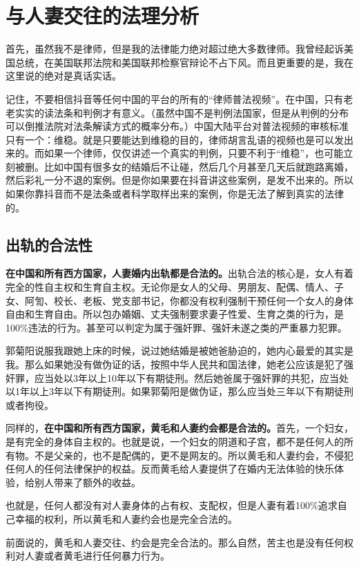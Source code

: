 \section{与人妻交往的法理分析}

首先，虽然我不是律师，但是我的法律能力绝对超过绝大多数律师。我曾经起诉美国总统，在美国联邦法院和美国联邦检察官辩论不占下风。而且更重要的是，我在这里说的绝对是真话实话。

记住，不要相信抖音等任何中国的平台的所有的``律师普法视频''。在中国，只有老老实实的读法条和判例才有意义。（虽然中国不是判例法国家，但是从判例的分布可以倒推法院对法条解读方式的概率分布。）中国大陆平台对普法视频的审核标准只有一个：维稳。就是只要能达到维稳的目的，律师胡言乱语的视频也是可以发出来的。而如果一个律师，仅仅讲述一个真实的判例，只要不利于``维稳''，也可能立刻被删。比如中国有很多女的结婚后不让碰，然后几个月甚至几天后就跑路离婚，然后彩礼一分不退的案例。但是你如果要在抖音讲这些案例，是发不出来的。所以如果你靠抖音而不是法条或者科学取样出来的案例，你是无法了解到真实的法律的。

\subsection{出轨的合法性}

\textbf{在中国和所有西方国家，人妻婚内出轨都是合法的。}出轨合法的核心是，女人有着完全的性自主权和生育自主权。无论你是女人的父母、男朋友、配偶、情人、子女、阿訇、校长、老板、党支部书记，你都没有权利强制干预任何一个女人的身体自由和生育自由。所以包办婚姻、丈夫强制要求妻子性爱、生育之类的行为，是100\%违法的行为。甚至可以判定为属于强奸罪、强奸未遂之类的严重暴力犯罪。

郭菊阳说服我跟她上床的时候，说过她结婚是被她爸胁迫的，她内心最爱的其实是我。那么如果她没有做伪证的话，按照中华人民共和国法律，她老公应该是犯了强奸罪，应当处以3年以上10年以下有期徒刑。然后她爸属于强奸罪的共犯，应当处以1年以上3年以下有期徒刑。如果郭菊阳是做伪证，那么应当处三年以下有期徒刑或者拘役。

同样的，\textbf{在中国和所有西方国家，黄毛和人妻约会都是合法的。}首先，一个妇女，是有完全的身体自主权的。也就是说，一个妇女的阴道和子宫，都不是任何人的所有物。不是父亲的，也不是配偶的，更不是网友的。所以黄毛和人妻约会，不侵犯任何人的任何法律保护的权益。反而黄毛给人妻提供了在婚内无法体验的快乐体验，给别人带来了额外的收益。

也就是，任何人都没有对人妻身体的占有权、支配权，但是人妻有着100\%追求自己幸福的权利，所以黄毛和人妻约会也是完全合法的。

前面说的，黄毛和人妻交往、约会是完全合法的。那么自然，苦主也是没有任何权利对人妻或者黄毛进行任何暴力行为。

